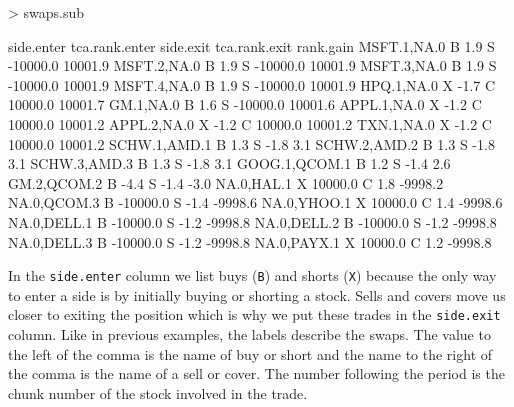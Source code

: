 \documentclass{article}
\begin{document}
\begin{Schunk}
\begin{Sinput}
> swaps.sub
\end{Sinput}
\begin{Soutput}
              side.enter tca.rank.enter side.exit tca.rank.exit rank.gain
MSFT.1,NA.0            B            1.9         S      -10000.0   10001.9
MSFT.2,NA.0            B            1.9         S      -10000.0   10001.9
MSFT.3,NA.0            B            1.9         S      -10000.0   10001.9
MSFT.4,NA.0            B            1.9         S      -10000.0   10001.9
HPQ.1,NA.0             X           -1.7         C       10000.0   10001.7
GM.1,NA.0              B            1.6         S      -10000.0   10001.6
APPL.1,NA.0            X           -1.2         C       10000.0   10001.2
APPL.2,NA.0            X           -1.2         C       10000.0   10001.2
TXN.1,NA.0             X           -1.2         C       10000.0   10001.2
SCHW.1,AMD.1           B            1.3         S          -1.8       3.1
SCHW.2,AMD.2           B            1.3         S          -1.8       3.1
SCHW.3,AMD.3           B            1.3         S          -1.8       3.1
GOOG.1,QCOM.1          B            1.2         S          -1.4       2.6
GM.2,QCOM.2            B           -4.4         S          -1.4      -3.0
NA.0,HAL.1             X        10000.0         C           1.8   -9998.2
NA.0,QCOM.3            B       -10000.0         S          -1.4   -9998.6
NA.0,YHOO.1            X        10000.0         C           1.4   -9998.6
NA.0,DELL.1            B       -10000.0         S          -1.2   -9998.8
NA.0,DELL.2            B       -10000.0         S          -1.2   -9998.8
NA.0,DELL.3            B       -10000.0         S          -1.2   -9998.8
NA.0,PAYX.1            X        10000.0         C           1.2   -9998.8
\end{Soutput}
\end{Schunk}

In the \texttt{side.enter} column we list buys (\texttt{B}) and shorts
(\texttt{X}) because the only way to enter a side is by initially
buying or shorting a stock.  Sells and covers move us closer to
exiting the position which is why we put these trades in the
\texttt{side.exit} column.  Like in previous examples, the labels
describe the swaps.  The value to the left of the comma is the name of
buy or short and the name to the right of the comma is the name of a
sell or cover.  The number following the period is the chunk number of
the stock involved in the trade.
\end{document}

